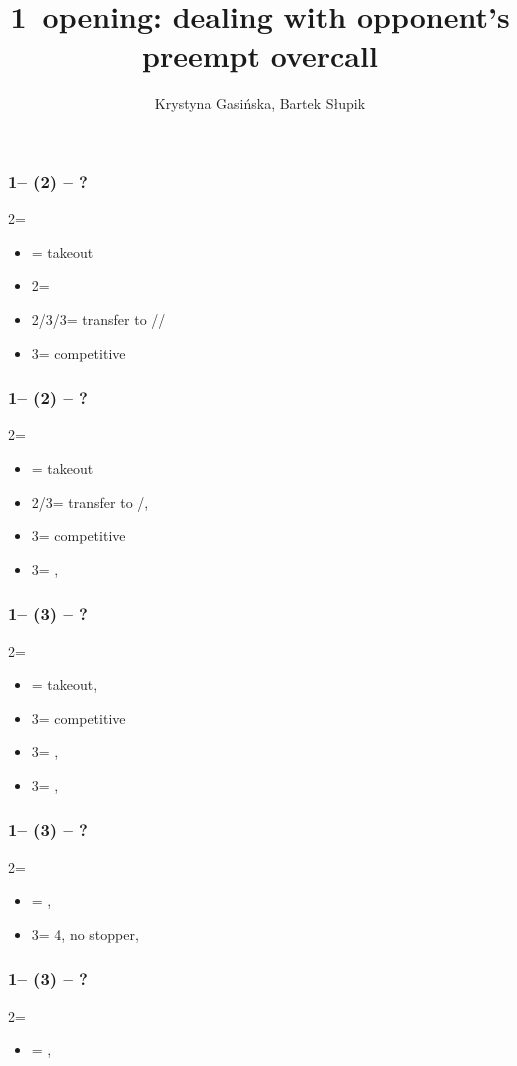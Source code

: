 \documentclass[12pt, a4paper]{article}
\title{1\diams\ opening: dealing with opponent's preempt overcall}
\author{Krystyna Gasińska, Bartek Słupik}
\begin{document}
\maketitle


\subsubsection*{1\diams -- (2\hearts) -- ?}
2\nt = \minor
\begin{itemize}
    \item \dbl = takeout
    \item 2\spades = \nat\ \nf
    \item 2\nt/3\clubs/3\hearts = transfer to \clubs/\diams/\spades \invp
    \item 3\diams = competitive
\end{itemize}

\subsubsection*{1\diams -- (2\spades) -- ?}
2\nt = \minor
\begin{itemize}
    \item \dbl = takeout
    \item 2\nt/3\clubs = transfer to \clubs/\diams, \invp
    \item 3\diams = competitive
    \item 3\hearts = \nat, \gf
\end{itemize}

\subsubsection*{1\diams -- (3\clubs) -- ?}
2\nt = \minor
\begin{itemize}
    \item \dbl = takeout, \gf
    \item 3\diams = competitive
    \item 3\hearts = \spades, \invp
    \item 3\spades = \hearts, \gf
\end{itemize}

\subsubsection*{1\diams -- (3\hearts) -- ?}
2\nt = \minor
\begin{itemize}
    \item \dbl = \spades, \gf
    \item 3\spades = 4\spades, no \hearts stopper, \gf
\end{itemize}

\subsubsection*{1\diams -- (3\spades) -- ?}
2\nt = \minor
\begin{itemize}
    \item \dbl = \hearts, \gf
\end{itemize}

\end{document}
